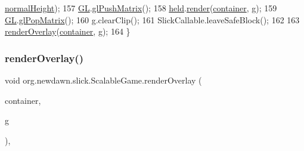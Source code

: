 \begin{DoxyCode}
      \mbox{\hyperlink{classorg_1_1newdawn_1_1slick_1_1_scalable_game_a47e0975aeb3ea50e10207311e2e9371e}{normalHeight}});
157         \mbox{\hyperlink{classorg_1_1newdawn_1_1slick_1_1_scalable_game_ae65f7d873f47a0b7898eb2a28a7c4cae}{GL}}.\mbox{\hyperlink{interfaceorg_1_1newdawn_1_1slick_1_1opengl_1_1renderer_1_1_s_g_l_ae9904a980aa014796bf1dcd748b63056}{glPushMatrix}}();
158         \mbox{\hyperlink{classorg_1_1newdawn_1_1slick_1_1_scalable_game_a9f1fb24a0827c8d6619e682e6239a475}{held}}.\mbox{\hyperlink{interfaceorg_1_1newdawn_1_1slick_1_1_game_af1a4670d43eb3ba04dfcf55ab1975b64}{render}}(\mbox{\hyperlink{classorg_1_1newdawn_1_1slick_1_1_scalable_game_ae8df04372ae01e645445bc4a22f58c7c}{container}}, g);
159         \mbox{\hyperlink{classorg_1_1newdawn_1_1slick_1_1_scalable_game_ae65f7d873f47a0b7898eb2a28a7c4cae}{GL}}.\mbox{\hyperlink{interfaceorg_1_1newdawn_1_1slick_1_1opengl_1_1renderer_1_1_s_g_l_ab8fd54b37e504c0b72d8b18b90c94c41}{glPopMatrix}}();
160         g.clearClip();
161         SlickCallable.leaveSafeBlock();
162         
163         \mbox{\hyperlink{classorg_1_1newdawn_1_1slick_1_1_scalable_game_a52d3b8fcb2c05da697b2dc22d0187127}{renderOverlay}}(\mbox{\hyperlink{classorg_1_1newdawn_1_1slick_1_1_scalable_game_ae8df04372ae01e645445bc4a22f58c7c}{container}}, g);
164     \}
\end{DoxyCode}
\mbox{\label{classorg_1_1newdawn_1_1slick_1_1_scalable_game_a52d3b8fcb2c05da697b2dc22d0187127}} 
\subsubsection{\texorpdfstring{render\+Overlay()}{renderOverlay()}}
{\footnotesize\ttfamily void org.\+newdawn.\+slick.\+Scalable\+Game.\+render\+Overlay (\begin{DoxyParamCaption}\item[{\mbox{\hyperlink{classorg_1_1newdawn_1_1slick_1_1_game_container}{Game\+Container}}}]{container,  }\item[{\mbox{\hyperlink{classorg_1_1newdawn_1_1slick_1_1_graphics}{Graphics}}}]{g }\end{DoxyParamCaption})\hspace{0.3cm}{\ttfamily [inline]}, {\ttfamily [protected]}}

